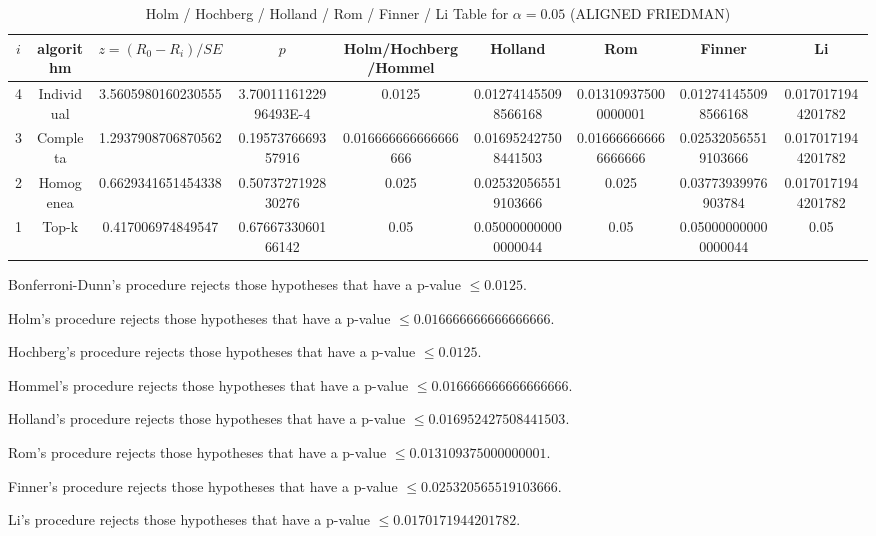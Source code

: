 \documentclass[a4paper,10pt]{article}
\begin{document}
\begin{landscape}
\begin{table}[!htp]
\centering\scriptsize
\caption{Holm / Hochberg / Holland / Rom / Finner / Li Table for $\alpha=0.05$ (ALIGNED FRIEDMAN)}
\begin{tabular}{ccccccccc}
$i$&algorithm&$z=(R_0 - R_i)/SE$&$p$&Holm/Hochberg/Hommel&Holland&Rom&Finner&Li\\
\hline
4&Individual&3.5605980160230555&3.7001116122996493E-4&0.0125&0.012741455098566168&0.013109375000000001&0.012741455098566168&0.0170171944201782\\
3&Completa&1.2937908706870562&0.1957376669357916&0.016666666666666666&0.016952427508441503&0.016666666666666666&0.025320565519103666&0.0170171944201782\\
2&Homogenea&0.6629341651454338&0.5073727192830276&0.025&0.025320565519103666&0.025&0.03773939976903784&0.0170171944201782\\
1&Top-k&0.417006974849547&0.6766733060166142&0.05&0.050000000000000044&0.05&0.050000000000000044&0.05\\
\hline
\end{tabular}
\end{table}
Bonferroni-Dunn's procedure rejects those hypotheses that have a p-value $\le0.0125$.


Holm's procedure rejects those hypotheses that have a p-value $\le0.016666666666666666$.


Hochberg's procedure rejects those hypotheses that have a p-value $\le0.0125$.


Hommel's procedure rejects those hypotheses that have a p-value $\le0.016666666666666666$.


Holland's procedure rejects those hypotheses that have a p-value $\le0.016952427508441503$.


Rom's procedure rejects those hypotheses that have a p-value $\le0.013109375000000001$.


Finner's procedure rejects those hypotheses that have a p-value $\le0.025320565519103666$.


Li's procedure rejects those hypotheses that have a p-value $\le0.0170171944201782$.



\newpage


\end{landscape}
\end{document}
